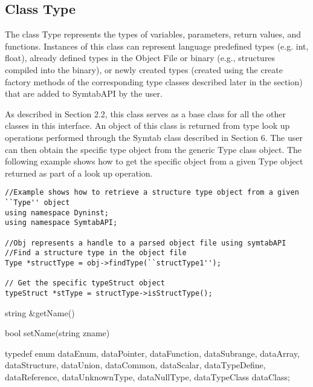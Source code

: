 \subsection{Class Type}

The class Type represents the types of variables, parameters, return values, and functions. Instances of this class can represent language predefined types (e.g. int, float), already defined types in the Object File or binary (e.g., structures compiled into the binary), or newly created types (created using the create factory methods of the corresponding type classes described later in the section) that are added to SymtabAPI by the user. 

As described in Section 2.2, this class serves as a base class for all the other classes in this interface. An object of this class is returned from type look up operations performed through the Symtab class described in Section 6. The user can then obtain the specific type object from the generic Type class object. The following example shows how to get the specific object from a given Type object returned as part of a look up operation.

\begin{lstlisting}
//Example shows how to retrieve a structure type object from a given ``Type'' object
using namespace Dyninst;
using namespace SymtabAPI;

//Obj represents a handle to a parsed object file using symtabAPI
//Find a structure type in the object file
Type *structType = obj->findType(``structType1'');

// Get the specific typeStruct object
typeStruct *stType = structType->isStructType();
\end{lstlisting}

\begin{apient}
string &getName()
\end{apient}

\begin{apient}
bool setName(string zname)
\end{apient}

\begin{apient}
typedef enum{ 
    dataEnum,
    dataPointer,
    dataFunction,
    dataSubrange,
    dataArray,
    dataStructure,
    dataUnion,
    dataCommon,
    dataScalar,
    dataTypeDefine,
    dataReference,
    dataUnknownType,
    dataNullType,
    dataTypeClass
} dataClass;
\end{apient}

